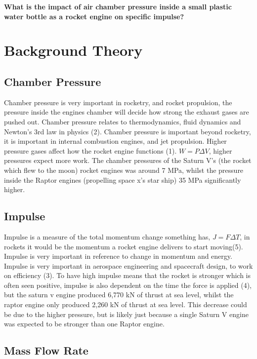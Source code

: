 \documentclass[12pt,a4paper]{article}
\begin{document}
\textbf{What is the impact of air chamber pressure inside a small plastic water bottle as a rocket engine on specific impulse?}

\section{Background Theory}

\subsection{Chamber Pressure}

Chamber pressure is very important in rocketry, and rocket propulsion, the pressure inside the engines chamber will decide how strong the exhaust gases are pushed out. Chamber pressure relates to thermodynamics, fluid dynamics and Newton's 3rd law in physics (2). Chamber pressure is important beyond rocketry, it is important in internal combustion engines, and jet propulsion. Higher pressure gases affect how the rocket engine functions (1). $W=P\Delta V$, higher pressures expect more work. The chamber pressures of the Saturn V's (the rocket which flew to the moon) rocket engines was around 7 MPa, whilst the pressure inside the Raptor engines (propelling space x's star ship) 35 MPa significantly higher.

\subsection{Impulse}

Impulse is a measure of the total momentum change something has, $J=F\Delta T$, in rockets it would be the momentum a rocket engine delivers to start moving(5). Impulse is very important in reference to change in momentum and energy. Impulse is very important in aerospace engineering and spacecraft design, to work on efficiency (3). To have high impulse means that the rocket is stronger which is often seen positive, impulse is also dependent on the time the force is applied (4), but the saturn v engine produced 6,770 kN of thrust at sea level, whilst the raptor engine only produced 2,260 kN of thrust at sea level. This decrease could be due to the higher pressure, but is likely just because a single Saturn V engine was expected to be stronger than one Raptor engine.

\subsection{Mass Flow Rate}
\end{document}
